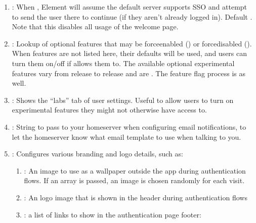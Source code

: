 \documentclass[letterpaper,10pt,openany,oneside,english]{sphinxmanual}
\begin{document}
\begin{enumerate}
\begin{itemize}
\end{itemize}

\item {} 
\sphinxAtStartPar
{}: When , Element will assume the default server supports SSO
and attempt to send the user there to continue (if they aren’t already logged in). Default
. Note that this disables all usage of the welcome page.

\item {} 
\sphinxAtStartPar
{}: Lookup of optional features that may be force\sphinxhyphen{}enabled () or force\sphinxhyphen{}disabled ().
When features are not listed here, their defaults will be used, and users can turn them on/off if 
allows them to. The available optional experimental features vary from release to release and are
. The feature flag process is  as well.

\item {} 
\sphinxAtStartPar
{}: Shows the “labs” tab of user settings. Useful to allow users to turn on experimental features
they might not otherwise have access to.

\item {} 
\sphinxAtStartPar
{}: String to pass to your homeserver when configuring email notifications, to let the
homeserver know what email template to use when talking to you.

\item {} 
\sphinxAtStartPar
{}: Configures various branding and logo details, such as:
\begin{enumerate}
%
\item {} 
\sphinxAtStartPar
{}: An image to use as a wallpaper outside the app
during authentication flows. If an array is passed, an image is chosen randomly for each visit.

\item {} 
\sphinxAtStartPar
{}: An logo image that is shown in the header during
authentication flows

\item {} 
\sphinxAtStartPar
{}: a list of links to show in the authentication page footer:


\end{enumerate}
\end{enumerate}
\end{document}
